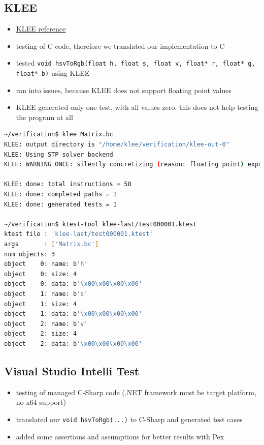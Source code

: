 \documentclass{scrreprt}
\begin{document}
\subsection{KLEE}

\begin{itemize}
	\item \href{http://klee.github.io}{KLEE reference}
	\item testing of C code, therefore we translated our implementation to C
	\item tested \texttt{void hsvToRgb(float h, float s, float v, float* r, float* g, float* b)} using KLEE
	\item ran into issues, because KLEE does not support floating point values
	\item KLEE generated only one test, with all values zero. this does not help testing the program at all
\end{itemize}

\begin{lstlisting}[language=bash, numbers=none]
~/verification$ klee Matrix.bc
KLEE: output directory is "/home/klee/verification/klee-out-0"
KLEE: Using STP solver backend
KLEE: WARNING ONCE: silently concretizing (reason: floating point) expression (ReadLSB w32 0 s) to value 0 (/home/klee/verification/Matrix.c:24)

KLEE: done: total instructions = 58
KLEE: done: completed paths = 1
KLEE: done: generated tests = 1

~/verification$ ktest-tool klee-last/test000001.ktest
ktest file : 'klee-last/test000001.ktest'
args       : ['Matrix.bc']
num objects: 3
object    0: name: b'h'
object    0: size: 4
object    0: data: b'\x00\x00\x00\x00'
object    1: name: b's'
object    1: size: 4
object    1: data: b'\x00\x00\x00\x00'
object    2: name: b'v'
object    2: size: 4
object    2: data: b'\x00\x00\x00\x00'
\end{lstlisting}

\subsection{Visual Studio Intelli Test}

\begin{itemize}
	\item testing of managed C-Sharp code (.NET framework must be target platform, no x64 support)
	\item translated our \texttt{void hsvToRgb(...)} to C-Sharp and generated test cases
	\item added some assertions and assumptions for better results with Pex
\end{itemize}
\end{document}
